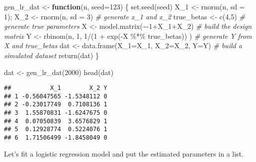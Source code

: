 \documentclass[
]{article}
\newenvironment{Shaded}{\begin{snugshade}}{\end{snugshade}}
\newcommand{\AttributeTok}[1]{\textcolor[rgb]{0.77,0.63,0.00}{#1}}
\newcommand{\CommentTok}[1]{\textcolor[rgb]{0.56,0.35,0.01}{\textit{#1}}}
\newcommand{\ControlFlowTok}[1]{\textcolor[rgb]{0.13,0.29,0.53}{\textbf{#1}}}
\newcommand{\DecValTok}[1]{\textcolor[rgb]{0.00,0.00,0.81}{#1}}
\newcommand{\FunctionTok}[1]{\textcolor[rgb]{0.00,0.00,0.00}{#1}}
\newcommand{\NormalTok}[1]{#1}
\newcommand{\OtherTok}[1]{\textcolor[rgb]{0.56,0.35,0.01}{#1}}
\newcommand{\SpecialCharTok}[1]{\textcolor[rgb]{0.00,0.00,0.00}{#1}}
\begin{document}
\begin{Shaded}
\begin{Highlighting}[]
\NormalTok{gen\_lr\_dat }\OtherTok{\textless{}{-}} \ControlFlowTok{function}\NormalTok{(n, }\AttributeTok{seed=}\DecValTok{123}\NormalTok{)}
\NormalTok{\{}
\FunctionTok{set.seed}\NormalTok{(seed)}
\NormalTok{X\_1 }\OtherTok{\textless{}{-}} \FunctionTok{rnorm}\NormalTok{(n, }\AttributeTok{sd =} \DecValTok{1}\NormalTok{); X\_2 }\OtherTok{\textless{}{-}} \FunctionTok{rnorm}\NormalTok{(n, }\AttributeTok{sd =} \DecValTok{3}\NormalTok{) }\CommentTok{\# generate x\_1 and x\_2}
\NormalTok{true\_betas }\OtherTok{\textless{}{-}} \FunctionTok{c}\NormalTok{(}\DecValTok{4}\NormalTok{,}\DecValTok{5}\NormalTok{) }\CommentTok{\# generate true parameters}
\NormalTok{X }\OtherTok{\textless{}{-}} \FunctionTok{model.matrix}\NormalTok{(}\SpecialCharTok{\textasciitilde{}{-}}\DecValTok{1}\SpecialCharTok{+}\NormalTok{X\_1}\SpecialCharTok{+}\NormalTok{X\_2) }\CommentTok{\# build the design matrix}
\NormalTok{Y }\OtherTok{\textless{}{-}} \FunctionTok{rbinom}\NormalTok{(n, }\DecValTok{1}\NormalTok{, }\DecValTok{1}\SpecialCharTok{/}\NormalTok{(}\DecValTok{1} \SpecialCharTok{+} \FunctionTok{exp}\NormalTok{(}\SpecialCharTok{{-}}\NormalTok{X }\SpecialCharTok{\%*\%}\NormalTok{ true\_betas)) ) }\CommentTok{\# generate Y from X and true\_betas}
\NormalTok{dat  }\OtherTok{\textless{}{-}}  \FunctionTok{data.frame}\NormalTok{(}\AttributeTok{X\_1=}\NormalTok{X\_1, }\AttributeTok{X\_2=}\NormalTok{X\_2, }\AttributeTok{Y=}\NormalTok{Y) }\CommentTok{\# build a simulated dataset}
\FunctionTok{return}\NormalTok{(dat)}
\NormalTok{\}}
\end{Highlighting}
\end{Shaded}

\begin{Shaded}
\begin{Highlighting}[]
\NormalTok{dat }\OtherTok{\textless{}{-}} \FunctionTok{gen\_lr\_dat}\NormalTok{(}\DecValTok{2000}\NormalTok{)}
\FunctionTok{head}\NormalTok{(dat)}
\end{Highlighting}
\end{Shaded}

\begin{verbatim}
##           X_1        X_2 Y
## 1 -0.56047565 -1.5348112 0
## 2 -0.23017749  0.7108136 1
## 3  1.55870831 -1.6247675 0
## 4  0.07050839  3.6576829 1
## 5  0.12928774  0.5224076 1
## 6  1.71506499 -1.8458049 0
\end{verbatim}

Let's fit a logistic regression model and put the estimated parameters
in a list.
\end{document}
